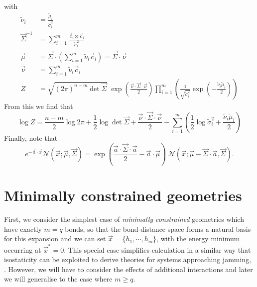 \documentclass[11pt,twoside]{report}
\begin{document}
with
\begin{subequations}
\begin{align}
  \tilde{\nu}_i &= \frac{\tilde{\mu}_i}{\tilde{\sigma}_i^2} \\
  \vec{\Sigma}^{-1} &= \sum_{i=1}^m \frac{\vec{c}_i \otimes \vec{c}_i}{\tilde{\sigma}_i^2}
  \label{eq:combined-normals-sigma}
  \\
  \vec{\mu} &=
  \vec{\Sigma} \cdot \left( \sum_{i=1}^m \tilde{\nu}_i \vec{c}_i \right)
  = \vec{\Sigma} \cdot \vec{\nu}
  \\
  \vec{\nu} &= \sum_{i=1}^m \tilde{\nu}_i \vec{c}_i
  \label{eq:combined-normals-nu}
  \\
  Z &=
  \sqrt{ (2\pi)^{n-m} \det{\vec{\Sigma}} }
  \;
  \exp{\left( \frac{\vec{\nu} \cdot \vec{\Sigma} \cdot \vec{\nu}}{2} \right)}
  \prod_{i=1}^m
  \left(
  \frac{1}{\sqrt{ \tilde{\sigma}_i^2 }}
  \exp{\left(-\frac{\tilde{\nu}_i \tilde{\mu}_i}{2}\right)}
  \right)
  \label{eq:combined-normals-Z}
\end{align}
\end{subequations}
From this we find that
\begin{equation}
  \log{Z} =
  \frac{n-m}{2} \log{2\pi} +
  \frac{1}{2} \log\det{\vec{\Sigma}} +
  \frac{\vec{\nu} \cdot \vec{\Sigma} \cdot \vec{\nu}}{2} -
  \sum_{i=1}^m
  \left(
  \frac{1}{2} \log{\tilde{\sigma}_i^2} +
  \frac{\tilde{\nu}_i \tilde{\mu}_i}{2}
  \right)
\end{equation}
Finally, note that
\begin{equation}\label{eq:biased-normal}
  e^{-\vec{a} \cdot \vec{x}} \mathcal{N}(\vec{x}; \vec{\mu}, \vec{\Sigma})
  =
  \exp{\left( \frac{\vec{a} \cdot \vec{\Sigma} \cdot \vec{a}}{2} - \vec{a} \cdot \vec{\mu} \right)} \;
  \mathcal{N}(\vec{x}; \vec{\mu} - \vec{\Sigma}\cdot\vec{a}, \vec{\Sigma}).
\end{equation}

\section{Minimally constrained geometries}

First, we consider the simplest case of \emph{minimally constrained} geometries which have exactly $m=q$ bonds, so that the bond-distance space forms a natural basis for this expansion and we can set $\vec{x} = \{h_1, \cdots, h_m\}$, with the energy minimum occurring at $\vec{x}^* = 0$.
This special case simplifies calculation in a similar way that isostaticity can be exploited to derive theories for systems approaching jamming, \cite{WyartAP2005,BritoEEL2006}.
However, we will have to consider the effects of additional interactions and later we will generalise to the case where $m \ge q$.
\end{document}
